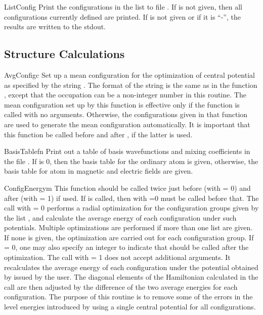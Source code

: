 \begin{fundesc}{ListConfig}{}
Print the configurations in the list  to file . If  is not
given, then all configurations currently defined are printed. If  is not
given or if it is ``-'', the results are written to the stdout.
\end{fundesc}


\subsection{Structure Calculations}

\begin{fundesc}{AvgConfig}{c}
Set up a mean configuration for the optimization of central potential as
specified by the string . The format of the string is the same as in the
function , except that the occupation can be a non-integer
number in this routine. The mean configuration set up by this function is
effective only if the function  is called with no
arguments. Otherwise, the configurations given in that function are used to
generate the mean configuration automatically. It is important that this
function be called before  and after
, if the latter is used.
\end{fundesc}

\begin{fundesc}{BasisTable}{fn}
Print out a table of basis wavefunctions and mixing coefficients in the file
. If  is 0, then the basis table for the ordinary atom is
given, otherwise, the basis table for atom in magnetic and electric fields are
given.
\end{fundesc}

\begin{fundesc}{ConfigEnergy}{m}
This function should be called twice just before (with  = 0) and after
(with  = 1)  if used. If  is
called, then  with =0 must be called before that.
The call with  = 0 performs a radial optimization for the configuration
groups given by the list , and calculate the average energy of each
configuration under such potentials. Multiple optimizations are performed if
more than one list are given. If none is given, the optimization are carried out
for each configuration group. If  = 0, one may also specify an integer
 to indicate that  should be called after the
optimization. The call with  = 1 does not accept additional arguments. It
recalculates the average energy of each configuration under the potential
obtained by  issued by the user. The diagonal elements
of the Hamiltonian calculated in the  call are then adjusted
by the difference of the two average energies for each configuration. The
purpose of this routine is to remove some of the errors in the level energies
introduced by using a single central potential for all configurations.
\end{fundesc}

